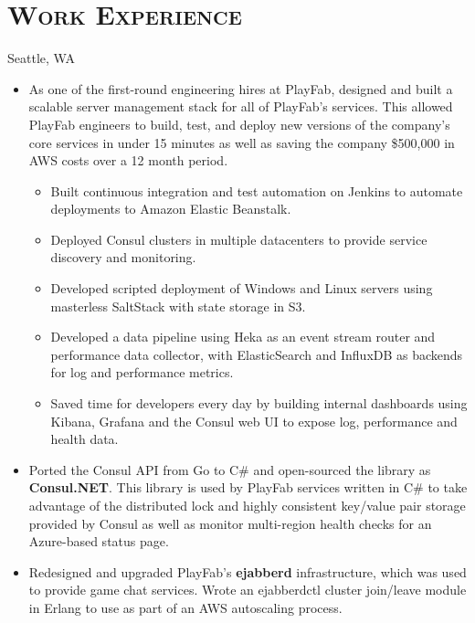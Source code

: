 \documentclass[11pt,letter,roman]{moderncv}
\begin{document}
\section{\textsc{Work Experience}}
{Seattle, WA}{}{%
  \begin{itemize}
    \item As one of the first-round engineering hires at PlayFab, designed and
      built a scalable server management stack for all of PlayFab's services.
      This allowed PlayFab engineers to build, test, and deploy new versions of
      the company's core services in under 15 minutes as well as saving the
      company \$500,000 in AWS costs over a 12 month period.
      \begin{itemize}
        \item Built continuous integration and test automation on Jenkins to
          automate deployments to Amazon Elastic Beanstalk.
        \item Deployed Consul clusters in multiple datacenters to provide
          service discovery and monitoring.
        \item Developed scripted deployment of Windows and Linux servers using
          masterless SaltStack with state storage in S3.
        \item Developed a data pipeline using Heka as an event stream router
          and performance data collector, with ElasticSearch and InfluxDB as
          backends for log and performance metrics.
        \item Saved time for developers every day by building internal
          dashboards using Kibana, Grafana and the Consul web UI to expose log,
          performance and health data.
      \end{itemize}
    \item Ported the Consul API from Go to C\# and open-sourced the library as
      \textbf{Consul.NET}. This library is used by PlayFab services written in
      C\# to take advantage of the distributed lock and highly consistent
      key/value pair storage provided by Consul as well as monitor multi-region
      health checks for an Azure-based status page.
    \item Redesigned and upgraded PlayFab's \textbf{ejabberd} infrastructure,
      which was used to provide game chat services. Wrote an ejabberdctl
      cluster join/leave module in Erlang to use as part of an AWS autoscaling
      process.
  \end{itemize}
}
\end{document}

